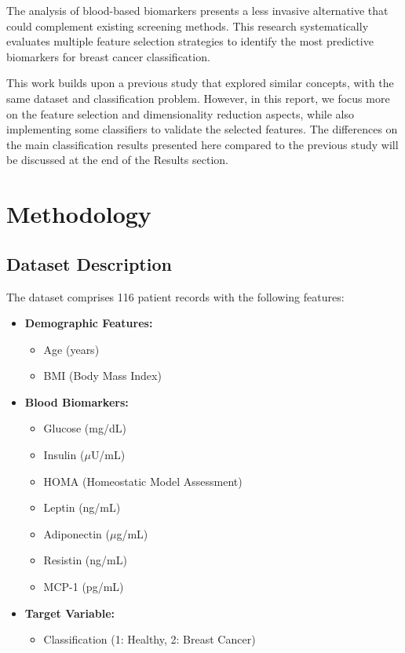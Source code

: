 \documentclass[12pt,a4paper]{article}
\begin{document}
The analysis of blood-based biomarkers presents a less invasive alternative that could complement existing screening methods. This research systematically evaluates multiple feature selection strategies to identify the most predictive biomarkers for breast cancer classification.

This work builds upon a previous study \cite{patricio2018using} that explored similar concepts, with the same dataset and classification problem. However, in this report, we focus more on the feature selection and dimensionality reduction aspects, while also implementing some classifiers to validate the selected features. The differences on the main classification results presented here compared to the previous study will be discussed at the end of the Results section.


\section{Methodology}
\label{sec:methodology}

\subsection{Dataset Description}
\label{subsec:dataset}

The dataset comprises 116 patient records with the following features:

\begin{itemize}
    \item \textbf{Demographic Features:}
    \begin{itemize}
        \item Age (years)
        \item BMI (Body Mass Index)
    \end{itemize}
    
    \item \textbf{Blood Biomarkers:}
    \begin{itemize}
        \item Glucose (mg/dL)
        \item Insulin ($\mu$U/mL)
        \item HOMA (Homeostatic Model Assessment)
        \item Leptin (ng/mL)
        \item Adiponectin ($\mu$g/mL)
        \item Resistin (ng/mL)
        \item MCP-1 (pg/mL)
    \end{itemize}
    
    \item \textbf{Target Variable:}
    \begin{itemize}
        \item Classification (1: Healthy, 2: Breast Cancer)
    \end{itemize}
\end{itemize}
\end{document}

